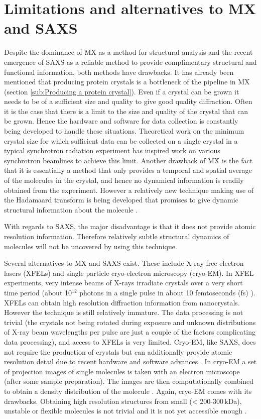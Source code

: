 \section{Limitations and alternatives to MX and SAXS}
\label{sec:Limitations and alternatives to MX and SAXS}
    Despite the dominance of MX as a method for structural analysis and the recent emergence of SAXS as a reliable method to provide complimentary structural and functional information, both methods have drawbacks.
    It has already been mentioned that producing protein crystals is a bottleneck of the pipeline in MX (section \ref{sub:Producing a protein crystal}).
    Even if a crystal can be grown it needs to be of a sufficient size and quality to give good quality diffraction.
    Often it is the case that there is a limit to the size and quality of the crystal that can be grown.
    Hence the hardware and software for data collection is constantly being developed to handle these situations.
    Theoretical work on the minimum crystal size for which sufficient data can be collected on a single crystal in a typical synchrotron radiation experiment \cite{holton2010} has inspired work on various synchrotron beamlines to achieve this limit.
    Another drawback of MX is the fact that it is essentially a method that only provides a temporal and spatial average of the molecules in the crystal, and hence no dynamical information is readily obtained from the experiment.
    However a relatively new technique making use of the Hadamaard transform is being developed that promises to give dynamic structural information about the molecule \cite{yorke2014time}.

    With regards to SAXS, the major disadvantage is that it does not provide atomic resolution information. Therefore relatively subtle structural dynamics of molecules will not be uncovered by using this technique.

    Several alternatives to MX and SAXS exist. These include X-ray free electron lasers (XFELs) and single particle cryo-electron microscopy (cryo-EM).
    In XFEL experiments, very intense beams of X-rays irradiate crystals over a very short time period (about 10$^{\text{12}}$ photons in a single pulse in about 10 femtoseconds (fs) \cite{chapman2011femtosecond}). XFELs can obtain high resolution diffraction information from nanocrystals.
    However the technique is still relatively immature.
    The data processing is not trivial (the crystals not being rotated during exposure and unknown distributions of X-ray beam wavelengths per pulse are just a couple of the factors complicating data processing), and access to XFELs is very limited.
    Cryo-EM, like SAXS, does not require the production of crystals but can additionally provide atomic resolution detail due to recent hardware and software advances \cite{bai2015cryo}.
    In cryo-EM a set of projection images of single molecules is taken with an electron microscope (after some sample preparation).
    The images are then computationally combined to obtain a density distribution of the molecule \cite{milne2013cryo}.
    Again, cryo-EM comes with its drawbacks. Obtaining high resolution structures from small (< 200-300$\,$kDa), unstable or flexible molecules is not trivial and it is not yet accessible enough \cite{bai2015cryo}.
